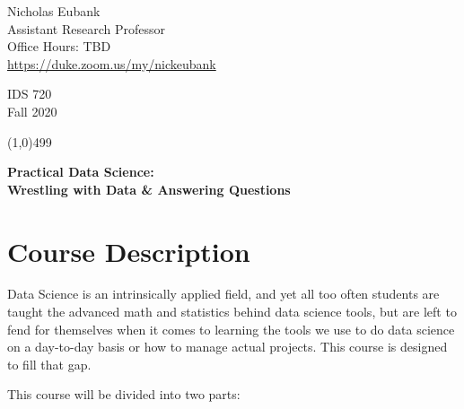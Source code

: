 \documentclass[12pt]{article}
\begin{document}
\singlespacing






\thispagestyle{empty}
\begin{minipage}[t]{.5\textwidth}
	Nicholas Eubank \\
	 Assistant Research Professor\\
	 Office Hours: TBD\\
	 \href{https://duke.zoom.us/my/nickeubank}{https://duke.zoom.us/my/nickeubank}
     \vspace*{0.1cm}
\end{minipage}
\begin{minipage}[t]{.5\textwidth}
	\begin{flushright}  IDS 720\\
	Fall 2020
    \vspace*{0.1cm}
\end{flushright}
\end{minipage}


\line(1,0){499}

\vspace{.35in}

\begin{center}
	\textbf{\LARGE{Practical Data Science:} }\\
	\vspace*{.05in}
	\textbf{\large{Wrestling with Data \& Answering Questions}}
\end{center}








\section{Course Description}

Data Science is an intrinsically applied field, and yet all too often students are taught the advanced math and statistics behind data science tools, but are left to fend for themselves when it comes to learning the tools we use to do data science on a day-to-day basis or how to manage actual projects. This course is designed to fill that gap.

This course will be divided into two parts:
\end{document}
